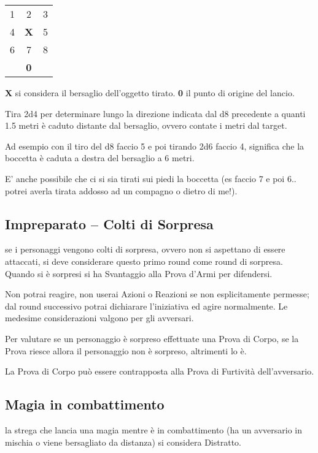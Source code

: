 \documentclass[12pt,a4paper,twoside,openany]{book}
\begin{document}
\begin{multicols}{2}
\begin{tabularx}{0.30\textwidth}{ccc}
1& 2& 3\\
4 &\textbf{X}& 5\\
6 &7 &8\\
&\textbf{0}&\\
\end{tabularx}

\smallskip

\textbf{X} si considera il bersaglio dell'oggetto tirato. \textbf{0} il punto di origine del lancio.

Tira 2d4 per determinare lungo la direzione indicata dal d8 precedente a quanti 1.5 metri è caduto distante dal bersaglio, ovvero contate i metri dal target.

Ad esempio con il tiro del d8 faccio 5 e poi tirando 2d6 faccio 4, significa che la boccetta è caduta a destra del bersaglio a 6 metri.

E' anche possibile che ci si sia tirati sui piedi la boccetta (es faccio 7 e poi 6.. potrei averla tirata addosso ad un compagno o dietro di me!).

\subsection{Impreparato -- Colti di Sorpresa}\label{coltidisorpresa}

se i personaggi vengono colti di sorpresa, ovvero non si aspettano di essere attaccati, si deve considerare questo primo round come round di sorpresa. Quando si è sorpresi si ha Svantaggio alla Prova d'Armi per difendersi.

Non potrai reagire, non userai Azioni o Reazioni se non esplicitamente permesse; dal round successivo potrai dichiarare l'iniziativa ed agire normalmente. Le medesime considerazioni valgono per gli avversari.

Per valutare se un personaggio è sorpreso effettuate una Prova di Corpo, se la Prova riesce allora il personaggio non è sorpreso, altrimenti lo è.

La Prova di Corpo può essere contrapposta alla Prova di Furtività dell'avversario.

\subsection{Magia in combattimento}\label{magiaincombattimento}

la strega che lancia una magia mentre è in combattimento (ha un avversario in mischia o viene bersagliato da distanza) si considera Distratto.


\end{multicols}
\end{document}
